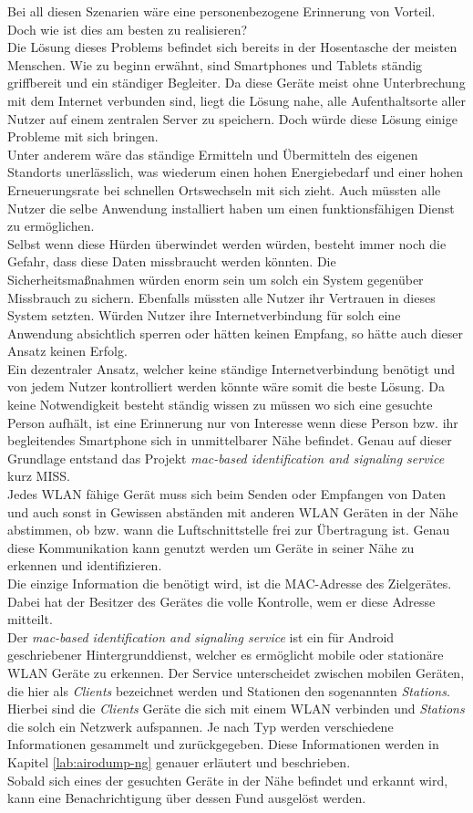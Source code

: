 \documentclass[]{report}
\begin{document}
Bei all diesen Szenarien wäre eine personenbezogene Erinnerung von Vorteil. Doch wie ist dies am besten zu realisieren? \\ 
Die Lösung dieses Problems befindet sich bereits in der Hosentasche der meisten Menschen. Wie zu beginn erwähnt, sind Smartphones und Tablets ständig griffbereit und ein ständiger Begleiter. Da diese Geräte meist ohne Unterbrechung mit dem Internet verbunden sind, liegt die Lösung nahe, alle Aufenthaltsorte aller Nutzer auf einem zentralen Server zu speichern. Doch würde diese Lösung einige Probleme mit sich bringen. \\
Unter anderem wäre das ständige Ermitteln und Übermitteln des eigenen Standorts unerlässlich, was wiederum einen hohen Energiebedarf und einer hohen Erneuerungsrate bei schnellen Ortswechseln mit sich zieht. Auch müssten alle Nutzer die selbe Anwendung installiert haben um einen funktionsfähigen Dienst zu ermöglichen. \\
Selbst wenn diese Hürden überwindet werden würden, besteht immer noch die Gefahr, dass diese Daten missbraucht werden könnten. Die Sicherheitsmaßnahmen würden enorm sein um solch ein System gegenüber Missbrauch zu sichern. Ebenfalls müssten alle Nutzer ihr Vertrauen in dieses System setzten. Würden Nutzer ihre Internetverbindung für solch eine Anwendung absichtlich sperren oder hätten keinen Empfang, so hätte auch dieser Ansatz keinen Erfolg.\\
Ein dezentraler Ansatz, welcher keine ständige Internetverbindung benötigt und von jedem Nutzer kontrolliert werden könnte wäre somit die beste Lösung. Da keine Notwendigkeit besteht ständig wissen zu müssen wo sich eine gesuchte Person aufhält, ist eine Erinnerung nur von Interesse  wenn diese Person bzw. ihr begleitendes Smartphone sich in unmittelbarer Nähe befindet. Genau auf dieser Grundlage entstand das Projekt \textit{mac-based identification and signaling service} kurz MISS.\\
Jedes WLAN fähige Gerät muss sich beim Senden oder Empfangen von Daten und auch sonst in Gewissen abständen mit anderen WLAN Geräten in der Nähe abstimmen, ob bzw. wann die Luftschnittstelle frei zur Übertragung ist. Genau diese Kommunikation kann genutzt werden um Geräte in seiner Nähe zu erkennen und identifizieren.\\ Die einzige Information die benötigt wird, ist die MAC-Adresse des Zielgerätes. Dabei hat der Besitzer des Gerätes die volle Kontrolle, wem er diese Adresse mitteilt. \\
Der \textit{mac-based identification and signaling service} ist ein für Android geschriebener Hintergrunddienst, welcher es ermöglicht mobile oder stationäre WLAN Geräte zu erkennen. Der Service unterscheidet zwischen mobilen Geräten, die hier als \textit{Clients} bezeichnet werden und Stationen den sogenannten \textit{Stations}. Hierbei sind die \textit{Clients} Geräte die sich mit einem WLAN verbinden und \textit{Stations} die solch ein Netzwerk aufspannen. Je nach Typ werden verschiedene Informationen gesammelt und zurückgegeben. Diese Informationen werden in Kapitel \ref{lab:airodump-ng} genauer erläutert und beschrieben.\\
Sobald sich eines der gesuchten Geräte in der Nähe befindet und erkannt wird, kann eine Benachrichtigung über dessen Fund ausgelöst werden.
\end{document}
